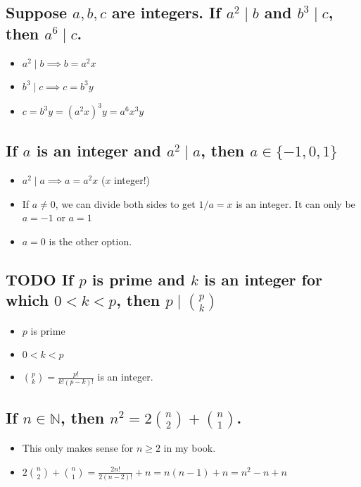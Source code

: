 \documentclass[11pt, oneside]{amsart}
\begin{document}
\subsection{Suppose \(a, b, c\) are integers.  If \(a^2 \mid b\) and \(b^3 \mid c\), then \(a^6 \mid c\).}
\label{sec:orgf7e5712}
\begin{itemize}
\item \(a^2 \mid b \implies b = a^2 x\)
\item \(b^3 \mid c \implies c = b^3 y\)
\item \(c = b^3 y = (a^2 x)^3 y = a^6 x^3 y\)
\end{itemize}

\subsection{If \(a\) is an integer and \(a^2 \mid a\), then \(a \in \{-1, 0 , 1\}\)}
\label{sec:orgc4cfd3a}
\begin{itemize}
\item \(a^2 \mid a \implies a = a^2 x\)  (\(x\) integer!)
\item If \(a \neq 0\), we can divide both sides to get \(1/a = x\) is an integer.  It can only be \(a=-1\) or \(a=1\)
\item \(a=0\) is the other option.
\end{itemize}

\subsection{{\bfseries\sffamily TODO} If \(p\) is prime and \(k\) is an integer for which \(0<k<p\), then \(p \mid {p \choose k}\)}
\label{sec:org4c1fffb}
\begin{itemize}
\item \(p\) is prime
\item \(0<k<p\)
\item \({p \choose k} = \frac{p!}{k!(p-k)!}\) is an integer.
\end{itemize}

\subsection{If \(n \in \mathbb{N}\), then \(n^2 = 2{n \choose 2}+ {n \choose 1}\).}
\label{sec:org281d180}
\begin{itemize}
\item This only makes sense for \(n \geq 2\) in my book.
\item \(2{n \choose 2} + {n \choose 1} = \frac{2n!}{2(n-2)!} + n = n(n-1)+n = n^2-n+n\)
\end{itemize}
\end{document}
